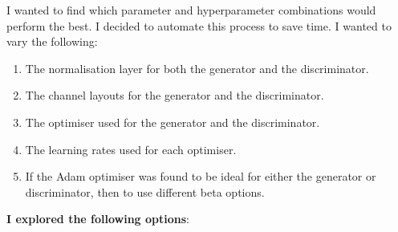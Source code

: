 \documentclass{UoYCSproject}
\begin{document}
I wanted to find which parameter and hyperparameter combinations would perform the best. I decided to automate this process to save time. I wanted to vary the following:
\begin{enumerate}
\item The normalisation layer for both the generator and the discriminator.
\item The channel layouts for the generator and the discriminator.
\item The optimiser used for the generator and the discriminator.
\item The learning rates used for each optimiser.
\item If the Adam optimiser was found to be ideal for either the generator or discriminator, then to use different beta options.
\end{enumerate}

\textbf{I explored the following options}:
\end{document}
